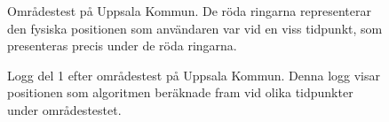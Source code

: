 \documentclass[a4paper,12pt]{article}
\begin{document}
 \begin{figure}[H]
   \centering
   \caption{Områdestest på Uppsala Kommun. De röda ringarna representerar den fysiska positionen som användaren var vid en viss tidpunkt, som presenteras precis under de röda ringarna.}
   \label{fig:omrades_test}
 \end{figure}

 \begin{figure}[H]
   \centering
   \caption{Logg del 1 efter områdestest på Uppsala Kommun. Denna logg visar positionen som algoritmen beräknade fram vid olika tidpunkter under områdestestet.}
   \label{fig:logg_omradestest1}
 \end{figure}
\end{document}
